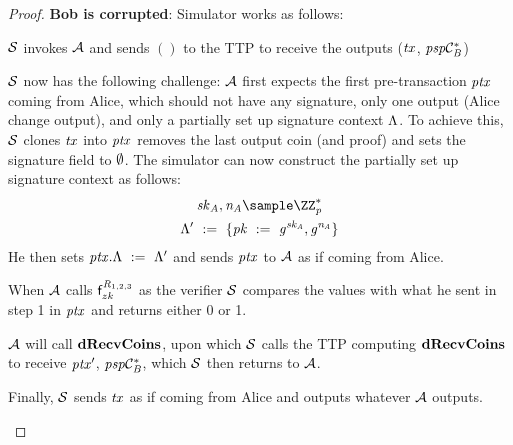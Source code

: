 \begin{proof}
    \textbf{Bob is corrupted}: Simulator works as follows:
    \begin{asparaenum}
        \item $\mathcal{S}$ invokes $\mathcal{A}$ and sends $()$ to the TTP to receive the outputs ($\mathit{tx}$, $\mathit{psp}\mathcal{C}_{\mathit{B}}^*$)
        \item $\mathcal{S}$ now has the following challenge: $\mathcal{A}$ first expects the first pre-transaction $\mathit{ptx}$ coming from Alice, which should not have any signature, only one output (Alice change output), and only a partially set up signature context $\Lambda$.
        To achieve this, $\mathcal{S}$ clones $\mathit{tx}$ into $\mathit{ptx}$ removes the last output coin (and proof) and sets the signature field to $\emptyset$.
        The simulator can now construct the partially set up signature context as follows:
        \begin{gather*}
            \varSecKeyAlice, \varNonceAlice \sample \cnstIntegersPrimeWithoutZero{\varPrime} \\
            \funStarAlt{\varSigContext} \opAssign \{ \varPubKey \opAssign \funGen{\varSecKeyAlice}, \funGen{\varNonceAlice} \}
        \end{gather*}
        He then sets $\mathit{ptx}.\Lambda ~:=~ {\Lambda}'$ and sends $\mathit{ptx}$ to $\mathcal{A}$ as if coming from Alice.
        \item When $\mathcal{A}$ calls $\mathsf{f}^{\mathit{R}_{1,2,3}}_{zk}$ as the verifier $\mathcal{S}$ compares the values with what he sent in step 1 in $\mathit{ptx}$ and returns either 0 or 1.
        \item $\mathcal{A}$ will call $\mathbf{dRecvCoins}$, upon which $\mathcal{S}$ calls the TTP computing $\mathbf{dRecvCoins}$ to receive ${\mathit{ptx}}'$, $\mathit{psp}\mathcal{C}_{\mathit{B}}^*$, which $\mathcal{S}$ then returns to $\mathcal{A}$.
        \item Finally, $\mathcal{S}$ sends $\mathit{tx}$ as if coming from Alice and outputs whatever $\mathcal{A}$ outputs.
    \end{asparaenum}


\end{proof}
